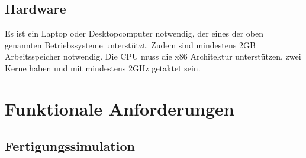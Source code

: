 \documentclass[parskip=full]{scrartcl}
\begin{document}
\subsection{Hardware}
\label{Hardware}
Es ist ein Laptop oder Desktopcomputer notwendig, der eines der oben genannten Betriebssysteme unterstützt.
Zudem sind mindestens 2GB Arbeitsspeicher notwendig. Die CPU muss die x86 Architektur unterstützen, zwei Kerne haben und mit
mindestens 2GHz getaktet sein.

\pagebreak
\section{Funktionale Anforderungen}
\subsection{Fertigungssimulation}
\end{document}
